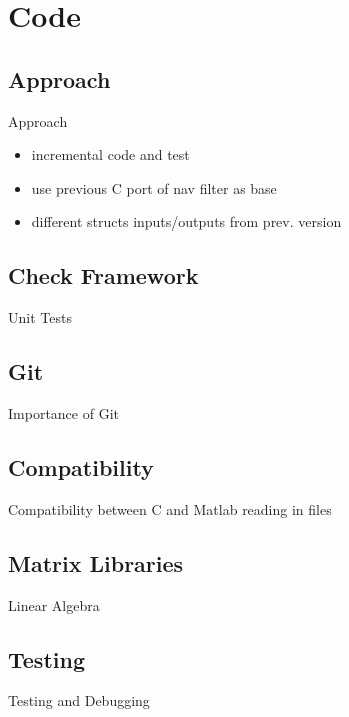 \documentclass[10pt,aspectratio=169]{beamer}
\begin{document}
\section{Code}%

\subsection{Approach}
	\begin{frame}{Approach}
		\begin{itemize}
			\item incremental code and test
			\item use previous C port of nav filter as base
			\item different structs inputs/outputs from prev. version
		\end{itemize}
	\end{frame}

\subsection{Check Framework}
	\begin{frame}{Unit Tests}
	\end{frame}

\subsection{Git}
	\begin{frame}{Importance of Git}
	\end{frame}

\subsection{Compatibility}
	\begin{frame}{Compatibility between C and Matlab}
		reading in files
	\end{frame}

\subsection{Matrix Libraries}
	\begin{frame}{Linear Algebra}
	\end{frame}

\subsection{Testing}
	\begin{frame}{Testing and Debugging}
	\end{frame}
\end{document}
